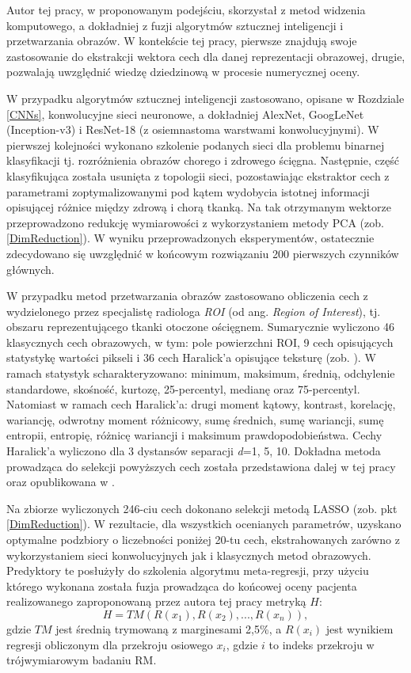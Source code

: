 Autor tej pracy, w proponowanym podejściu, skorzystał z metod widzenia komputowego, a dokładniej z fuzji algorytmów sztucznej inteligencji i przetwarzania obrazów. W kontekście tej pracy, pierwsze znajdują swoje zastosowanie do ekstrakcji wektora cech dla danej reprezentacji obrazowej, drugie, pozwalają uwzględnić wiedzę dziedzinową w procesie numerycznej oceny.

W przypadku algorytmów sztucznej inteligencji zastosowano,  opisane w Rozdziale \ref{CNNs}, konwolucyjne sieci neuronowe, a dokładniej AlexNet, GoogLeNet (Inception-v3) i ResNet-18 (z osiemnastoma warstwami konwolucyjnymi). W pierwszej kolejności wykonano szkolenie podanych sieci dla problemu binarnej klasyfikacji tj. rozróżnienia obrazów chorego i zdrowego ścięgna. Następnie, część klasyfikująca została usunięta z topologii sieci, pozostawiając ekstraktor cech z parametrami zoptymalizowanymi pod kątem wydobycia istotnej informacji opisującej różnice między zdrową i chorą tkanką. Na tak otrzymanym wektorze przeprowadzono redukcję wymiarowości z wykorzystaniem metody PCA (zob. \ref{DimReduction}). W wyniku przeprowadzonych eksperymentów, ostatecznie zdecydowano się uwzględnić w końcowym rozwiązaniu 200 pierwszych czynników głównych.

W przypadku metod przetwarzania obrazów zastosowano obliczenia cech z wydzielonego przez specjalistę radiologa \textit{ROI} (od ang. \textit{Region of Interest}), tj. obszaru reprezentującego tkanki otoczone ościęgnem. Sumarycznie wyliczono 46 klasycznych cech obrazowych, w tym: pole powierzchni ROI, 9 cech opisujących statystykę wartości pikseli i 36 cech Haralick'a opisujące teksturę (zob. \cite{Haralick1973}). W ramach statystyk scharakteryzowano: minimum, maksimum, średnią, odchylenie standardowe, skośność, kurtozę, 25-percentyl, medianę oraz 75-percentyl. Natomiast w ramach cech Haralick'a: drugi moment kątowy, kontrast, korelację, wariancję, odwrotny moment różnicowy, sumę średnich, sumę wariancji, sumę entropii, entropię, różnicę wariancji i maksimum prawdopodobieństwa. Cechy Haralick'a wyliczono dla 3 dystansów separacji \textit{d}=1, 5, 10. Dokładna metoda prowadząca do selekcji powyższych cech została przedstawiona dalej w tej pracy oraz opublikowana w \cite{Nowosielski17}.  

Na zbiorze wyliczonych 246-ciu cech dokonano selekcji metodą LASSO (zob. pkt \ref{DimReduction}). W rezultacie, dla wszystkich ocenianych parametrów, uzyskano optymalne podzbiory o liczebności poniżej 20-tu cech, ekstrahowanych zarówno z wykorzystaniem sieci konwolucyjnych jak i klasycznych metod obrazowych. Predyktory te posłużyły do szkolenia algorytmu meta-regresji, przy użyciu którego wykonana została fuzja prowadząca do końcowej oceny pacjenta realizowanego zaproponowaną przez autora tej pracy metryką $H$:
\begin{equation}
\label{ecq:H}
H = TM(R(x_1), R(x_2),..., R(x_n)),
\end{equation}
gdzie $TM$ jest średnią trymowaną z marginesami 2,5\%, a $R(x_i)$ jest wynikiem regresji obliczonym dla przekroju osiowego $x_i$, gdzie $i$ to indeks przekroju w trójwymiarowym badaniu RM.

